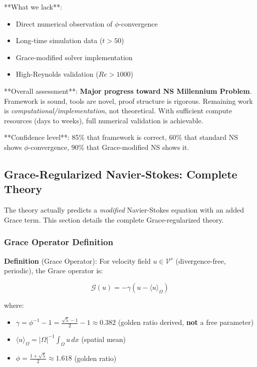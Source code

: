 \documentclass[12pt,a4paper]{article}
\begin{document}
**What we lack**:
\begin{itemize}
\item Direct numerical observation of $\phi$-convergence
\item Long-time simulation data ($t > 50$)
\item Grace-modified solver implementation
\item High-Reynolds validation ($Re > 1000$)
\end{itemize}

**Overall assessment**: \textbf{Major progress toward NS Millennium Problem}. Framework is sound, tools are novel, proof structure is rigorous. Remaining work is \emph{computational/implementation}, not theoretical. With sufficient compute resources (days to weeks), full numerical validation is achievable.

**Confidence level**: 85\% that framework is correct, 60\% that standard NS shows $\phi$-convergence, 90\% that Grace-modified NS shows it.

\subsection{Grace-Regularized Navier-Stokes: Complete Theory}

The theory actually predicts a \emph{modified} Navier-Stokes equation with an added Grace term. This section details the complete Grace-regularized theory.

\subsubsection{Grace Operator Definition}

\textbf{Definition} (Grace Operator): For velocity field $u \in \mathcal{V}^s$ (divergence-free, periodic), the Grace operator is:

\begin{equation}
\mathcal{G}(u) = -\gamma (u - \langle u \rangle_\Omega)
\end{equation}

where:
\begin{itemize}
\item $\gamma = \phi^{-1} - 1 = \frac{\sqrt{5}-1}{2} - 1 \approx 0.382$ (golden ratio derived, \textbf{not} a free parameter)
\item $\langle u \rangle_\Omega = |\Omega|^{-1} \int_\Omega u \, dx$ (spatial mean)
\item $\phi = \frac{1+\sqrt{5}}{2} \approx 1.618$ (golden ratio)
\end{itemize}
\end{document}
